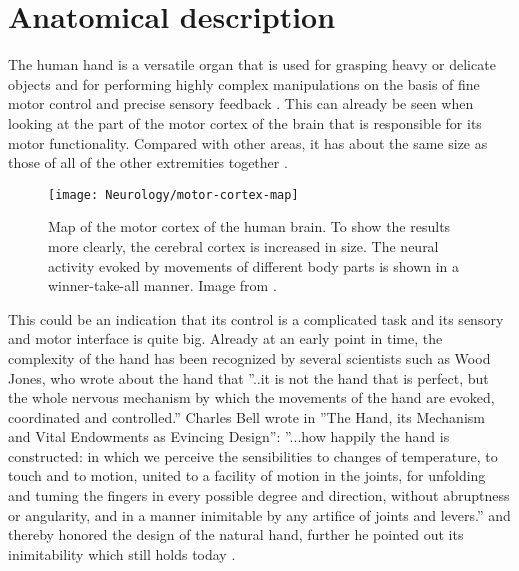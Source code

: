 \documentclass[main]{subfiles}
\begin{document}
\section{Anatomical description}
The human hand is a versatile organ that is used for grasping heavy or delicate objects and for performing highly complex manipulations on the basis of fine motor control and precise sensory feedback \cite{Kapandji1982}. This can already be seen when looking at the part of the motor cortex of the brain that is responsible for its motor functionality. Compared with other areas, it has about the same size as those of all of the other extremities together \cite{Meier2008}.\\

\begin{figure}[htp]
\centering
\texttt{[image: Neurology/motor-cortex-map]}
\caption[Map of the motor cortex of the human brain]{Map of the motor cortex of the human brain. To show the results more clearly, the cerebral cortex is increased in size. The neural activity evoked by movements of different body parts is shown in a winner-take-all manner. Image from \cite{Meier2008}.}
\label{motor-cortex-map}
\end{figure}

This could be an indication that its control is a complicated task and its sensory and motor interface is quite big. Already at an early point in time, the complexity of the hand has been recognized by several scientists such as Wood Jones, who wrote about the hand that ''..it is not the hand that is perfect, but the whole nervous mechanism by which the movements of the hand are evoked, coordinated and controlled.'' \cite{SensoryHand} Charles Bell wrote in ''The Hand, its Mechanism and Vital Endowments as Evincing Design'': ''...how happily the hand is constructed: in which we perceive the sensibilities to changes of temperature, to touch and to motion, united to a facility of motion in the joints, for unfolding and tuming the fingers in every possible degree and direction, without abruptness or angularity, and in a manner inimitable by any artifice of joints and levers.'' and thereby honored the design of the natural hand, further he pointed out its inimitability which still holds today \cite{BellHand}.
\end{document}
